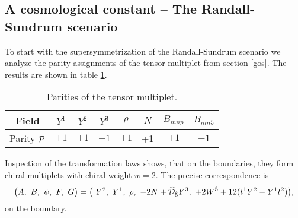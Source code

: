 \documentclass[a4paper,12pt, twoside]{article}
\numberwithin{equation}{section}
\begin{document}
\subsection{A cosmological constant -- The Randall-Sundrum 
scenario}\label{cosm}
To start with the supersymmetrization of the Randall-Sundrum scenario 
we analyze the parity assignments of the tensor multiplet from section 
\ref{gos}. The results are shown in table \ref{table22}.
\begin{table}
\begin{center}
\begin{tabular}{|c|c|c|c|c|c|c|c|}
\hline\hline

Field & $Y^1$ & $Y^2$ & $Y^3$& $\rho$ & $N$ & $B_{mnp}$ & $B_{mn5}$\\
\hline
Parity $\cal P$ & $+1$ & $+1$ & $-1$ & $+1$ &+1 & $+1$ &$-1$\\
\hline\hline
\end{tabular}
\end{center}
\caption{Parities of the  tensor multiplet.}\label{table22}
\end{table}
Inspection of the transformation laws shows, that on the boundaries, 
they form chiral multiplets with chiral weight $w=2$. 
The precise correspondence is
\begin{equation}
\big(A,~B,~\psi,~F,~G\big)= \big(~Y^2,~Y^1,~\rho,~-2N+\widehat{\cal 
D}_{\dot{5}}Y^3, ~+2 W^{\dot{5}}+12(t^1Y^2-Y^1t^2)\big),\label{emb}
\end{equation}
on the boundary.
 
\end{document}
